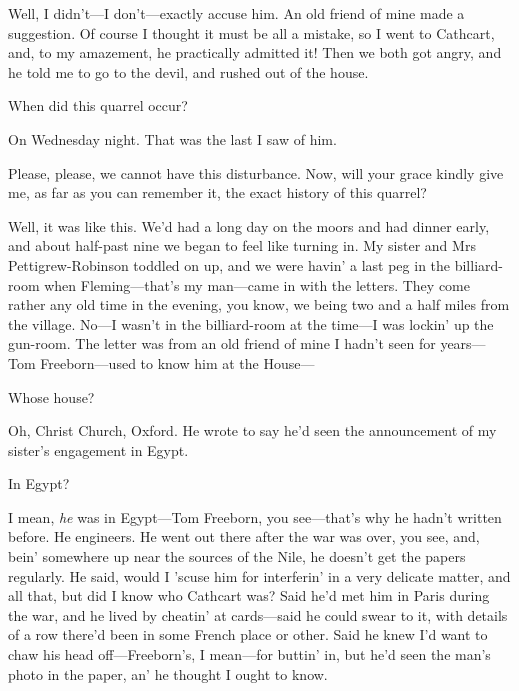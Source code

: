 \begin{dialogue}
 Well, I didn't\allowbreak---\allowbreak I don't\allowbreak---\allowbreak exactly accuse him. An old friend of mine made a suggestion. Of course I thought it must be all a mistake, so I went to Cathcart, and, to my amazement, he practically admitted it! Then we both got angry, and he told me to go to the devil, and rushed out of the house. 

 When did this quarrel occur?

 On Wednesday night. That was the last I saw of him. 

 Please, please, we cannot have this disturbance. Now, will your grace kindly give me, as far as you can remember it, the exact history of this quarrel?

 Well, it was like this. We'd had a long day on the moors and had dinner early, and about half-past nine we began to feel like turning in. My sister and Mrs Pettigrew-Robinson toddled on up, and we were havin' a last peg in the billiard-room when Fleming\allowbreak---\allowbreak that's my man\allowbreak---\allowbreak came in with the letters. They come rather any old time in the evening, you know, we being two and a half miles from the village.  No\allowbreak---\allowbreak I wasn't in the billiard-room at the time\allowbreak---\allowbreak I was lockin' up the gun-room. The letter was from an old friend of mine I hadn't seen for years\allowbreak---\allowbreak Tom Freeborn\allowbreak---\allowbreak used to know him at the House---

 Whose house?

 Oh, Christ Church, Oxford. He wrote to say he'd seen the announcement of my sister's engagement in Egypt.

 In Egypt?

 I mean, \textit{he} was in Egypt\allowbreak---\allowbreak Tom Freeborn, you see\allowbreak---\allowbreak that's why he hadn't written before. He engineers. He went out there after the war was over, you see, and, bein' somewhere up near the sources of the Nile, he doesn't get the papers regularly. He said, would I 'scuse him for interferin' in a very delicate matter, and all that, but did I know who Cathcart was? Said he'd met him in Paris during the war, and he lived by cheatin' at cards\allowbreak---\allowbreak said he could swear to it, with details of a row there'd been in some French place or other. Said he knew I'd want to chaw his head off\allowbreak---\allowbreak Freeborn's, I mean\allowbreak---\allowbreak for buttin' in, but he'd seen the man's photo in the paper, an' he thought I ought to know.


\end{dialogue}
